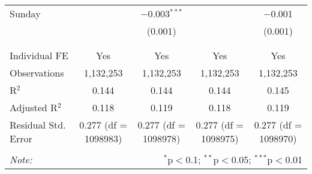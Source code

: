 \documentclass[
]{article}
\begin{document}
\begin{table}[!htbp]
{\begin{tabular}{@{\extracolsep{5pt}}lcccc}
 Sunday &  & $-$0.003$^{***}$ &  & $-$0.001 \\ 
  &  & (0.001) &  & (0.001) \\ 
  & & & & \\ 
\hline \\[-1.8ex] 
Individual FE & Yes & Yes & Yes & Yes \\ 
Observations & 1,132,253 & 1,132,253 & 1,132,253 & 1,132,253 \\ 
R$^{2}$ & 0.144 & 0.144 & 0.144 & 0.145 \\ 
Adjusted R$^{2}$ & 0.118 & 0.119 & 0.118 & 0.119 \\ 
Residual Std. Error & 0.277 (df = 1098983) & 0.277 (df = 1098978) & 0.277 (df = 1098975) & 0.277 (df = 1098970) \\ 
\hline 
\hline \\[-1.8ex] 
\textit{Note:}  & \multicolumn{4}{r}{$^{*}$p$<$0.1; $^{**}$p$<$0.05; $^{***}$p$<$0.01} \\ 
\end{tabular}
} 
\end{table}
\end{document}
